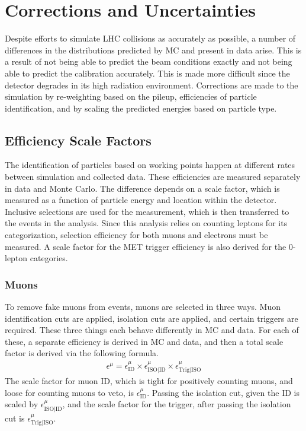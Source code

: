 \chapter{Corrections and Uncertainties}

Despite efforts to simulate LHC collisions as accurately as possible,
a number of differences in the distributions predicted by MC and present in data arise.
This is a result of not being able to predict the beam conditions exactly
and not being able to predict the calibration accurately.
This is made more difficult since the detector degrades in its high radiation environment.
Corrections are made to the simulation by re-weighting based on the pileup,
efficiencies of particle identification,
and by scaling the predicted energies based on particle type.

\section{Efficiency Scale Factors}

The identification of particles based on working points happen at different rates
between simulation and collected data.
These efficiencies are measured separately in data and Monte Carlo.
The difference depends on a scale factor,
which is measured as a function of particle energy and location within the detector.
Inclusive selections are used for the measurement,
which is then transferred to the events in the analysis.
Since this analysis relies on counting leptons for its categorization,
selection efficiency for both muons and electrons must be measured.
A scale factor for the MET trigger efficiency is also derived for the 0-lepton categories.

\subsection{Muons}

To remove fake muons from events, muons are selected in three ways.
Muon identification cuts are applied, isolation cuts are applied,
and certain triggers are required.
These three things each behave differently in MC and data.
For each of these, a separate efficiency is derived in MC and data,
and then a total scale factor is derived via the following formula.
\begin{gather}
  \epsilon^\mu = \epsilon^\mu_\mathrm{ID} \times \epsilon^\mu_\mathrm{ISO|ID} \times \epsilon^\mu_\mathrm{Trig|ISO}
\end{gather}
The scale factor for muon ID, which is tight for positively counting muons,
and loose for counting muons to veto, is $\epsilon^\mu_\mathrm{ID}$.
Passing the isolation cut, given the ID is scaled by $\epsilon^\mu_\mathrm{ISO|ID}$,
and the scale factor for the trigger, after passing the isolation cut is
$\epsilon^\mu_\mathrm{Trig|ISO}$.

